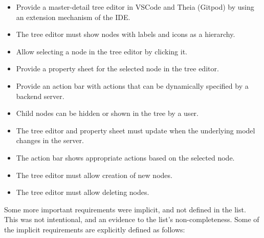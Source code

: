 \begin{itemize}
  \item Provide a master-detail tree editor in VSCode and Theia (Gitpod) by using an extension mechanism of the \gls{IDE}.
  \item The tree editor must show nodes with labels and icons as a hierarchy.
  \item Allow selecting a node in the tree editor by clicking it.
  \item Provide a property sheet for the selected node in the tree editor.
  \item Provide an action bar with actions that can be dynamically specified by a backend server.
  \item Child nodes can be hidden or shown in the tree by a user.
  \item The tree editor and property sheet must update when the underlying model changes in the server.
  \item The action bar shows appropriate actions based on the selected node.
  \item The tree editor must allow creation of new nodes.
  \item The tree editor must allow deleting nodes.
\end{itemize}

Some more important requirements were implicit, and not defined in the list.
This was not intentional, and an evidence to the list's non-completeness.
Some of the implicit requirements are explicitly defined as follows:

